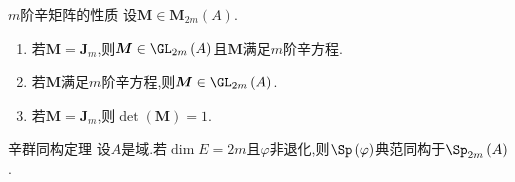 \begin{proposition}{$m$阶辛矩阵的性质}{}
	设$\boldsymbol{M}\in\mathbf{M}_{2m}\left(A\right)$.
	\begin{enumerate}
		\item 若$\boldsymbol{M}=\boldsymbol{J}_{m}$,则$\boldsymbol{M}\in\GL_{2m}\left(A\right)$且$\boldsymbol{M}$满足$m$阶辛方程.
		\item 若$\boldsymbol{M}$满足$m$阶辛方程,则$\boldsymbol{M}\in\GL_{2m}\left(A\right)$.
		\item 若$\boldsymbol{M}=\boldsymbol{J}_{m}$,则$\det\left(\boldsymbol{M}\right)=1$.
	\end{enumerate}
\end{proposition}

\begin{corollary}{辛群同构定理}{}
	设$A$是域.若$\dim E=2m$且$\varphi$非退化,则$\Sp\left(\varphi\right)$典范同构于$\Sp_{2m}\left(A\right)$.
\end{corollary}